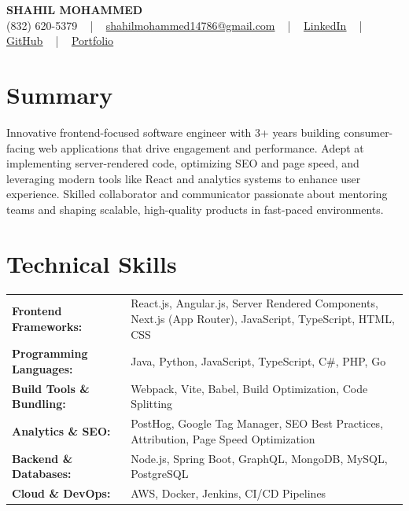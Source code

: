 \documentclass[letterpaper,11pt]{article}
\begin{document}
\begin{center}
    {\fontsize{14pt}{12pt}\selectfont \textbf{\MakeUppercase{Shahil Mohammed}}}\\ \vspace{2pt}
    \fontsize{10pt}{12pt}\selectfont (832) 620-5379 ~ | ~ \href{mailto:shahilmohammed14786@gmail.com}{shahilmohammed14786@gmail.com} ~ | ~  
    \href{https://www.linkedin.com/in/shahil-mohammed-9652931a1/}{\color{blue}\underline{LinkedIn}}  ~ | ~ 
    \href{https://github.com/freakbeast14}{\color{blue}\underline{GitHub}} ~ | ~ 
    \href{https://shahil-mohammed.netlify.app/}{\color{blue}\underline{Portfolio}}
    \vspace{-8pt}
\end{center}

\section{Summary}
\fontsize{9pt}{10pt}\selectfont
Innovative frontend-focused software engineer with 3+ years building consumer-facing web applications that drive engagement and performance. Adept at implementing server-rendered code, optimizing SEO and page speed, and leveraging modern tools like React and analytics systems to enhance user experience. Skilled collaborator and communicator passionate about mentoring teams and shaping scalable, high-quality products in fast-paced environments.
 \vspace{-5pt}
 
\section{Technical Skills}
        \vspace{-14pt}
        \begin{table}[h]
            \fontsize{9pt}{10pt}\selectfont
            \begin{tabular}{p{0.3\linewidth} p{0.7\linewidth}}
                \textbf{Frontend Frameworks:} & React.js, Angular.js, Server Rendered Components, Next.js (App Router), JavaScript, TypeScript, HTML, CSS \\
                \textbf{Programming Languages:} & Java, Python, JavaScript, TypeScript, C\#, PHP, Go \\
                \textbf{Build Tools \& Bundling:} & Webpack, Vite, Babel, Build Optimization, Code Splitting \\
                \textbf{Analytics \& SEO:} & PostHog, Google Tag Manager, SEO Best Practices, Attribution, Page Speed Optimization \\
                \textbf{Backend \& Databases:} & Node.js, Spring Boot, GraphQL, MongoDB, MySQL, PostgreSQL \\
                \textbf{Cloud \& DevOps:} & AWS, Docker, Jenkins, CI/CD Pipelines \\
            \end{tabular}
        \end{table}
 \vspace{-15pt}
 
\end{document}
